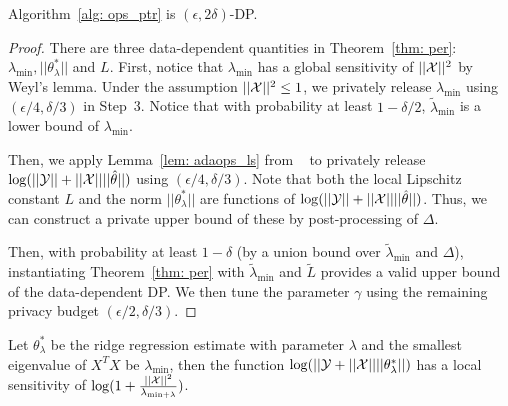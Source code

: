 \begin{theorem}
Algorithm~\ref{alg: ops_ptr} is $(\epsilon, 2\delta)$-DP.
\end{theorem}
\begin{proof}
There are three data-dependent quantities in Theorem~\ref{thm: per}: $\lambda_{
\text{min}}, ||\theta_\lambda^*||$ and $L$.
First, notice  that $\lambda_{\text{min}}$ has a global sensitivity of $||\mathcal{X}||^2$ by Weyl's lemma. Under the assumption $||\mathcal{X}||^2\leq 1$, we privately release $\lambda_{\text{min}}$ using $(\epsilon/4,\delta/3)$ in Step~3.
Notice that with probability at least $1-\delta/2$, $\tilde{\lambda}_{\min}$ is a lower bound of $\lambda_{\min}$. 

Then, we apply Lemma~\ref{lem: adaops_ls} from ~\citet{wang2018revisiting} to privately release $\log(||\mathcal{Y}||+||\mathcal{X}||||\hat{\theta}||)$ using $(\epsilon/4, \delta/3)$. Note that both the local Lipschitz constant $L$ and the norm  $||\theta_\lambda^*||$ are functions of $\log(||\mathcal{Y}||+||\mathcal{X}||||\hat{\theta}||)$. Thus, we can construct a private upper bound of these by post-processing of $\Delta$.

Then, with probability at least $1-\delta$ (by a union bound over $\tilde{\lambda}_{\min}$ and $\Delta$), instantiating Theorem~\ref{thm: per} with $\tilde{\lambda}_{\min}$ and $\tilde{L}$ provides a valid upper bound of the data-dependent DP.
We then tune the parameter $\gamma$ using the remaining privacy budget $(\epsilon/2, \delta/3)$.
\end{proof}

\begin{lemma}\label{lem: adaops_ls}
Let $\theta_\lambda^*$ be the ridge regression estimate with parameter $\lambda$ and the smallest eigenvalue of $X^TX$ be $\lambda_{\text{min}}$, then the function $\log(||\mathcal{Y} +||\mathcal{X}||||\theta_\lambda^*||)$ has a local sensitivity of $\log(1+\frac{||\mathcal{X}||^2}{\lambda_{\text{min}+\lambda}})$.
\end{lemma}
